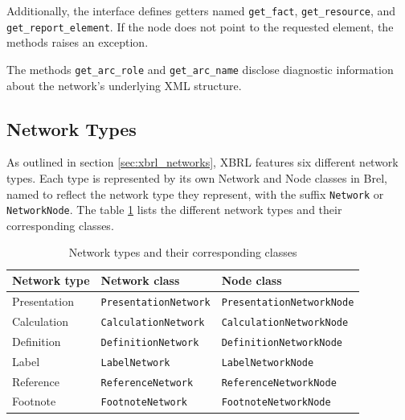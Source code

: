 Additionally, the interface defines getters named \texttt{get\_fact}, \texttt{get\_resource}, and \texttt{get\_report\_element}.
If the node does not point to the requested element, the methods raises an exception.

The methods \texttt{get\_arc\_role} and \texttt{get\_arc\_name} disclose diagnostic information about the network's underlying XML structure.

\subsection{Network Types}

As outlined in section \ref{sec:xbrl_networks}, XBRL features six different network types.
Each type is represented by its own Network and Node classes in Brel,
named to reflect the network type they represent, with the suffix \texttt{Network} or \texttt{NetworkNode}.
The table \ref{tab:network_types} lists the different network types and their corresponding classes.

\begin{table}[H]
    \centering
    \caption{Network types and their corresponding classes}
    \begin{tabular}{|l|l|l|}
        \hline
        \textbf{Network type} & \textbf{Network class} & \textbf{Node class} \\ \hline
        Presentation          & \texttt{PresentationNetwork}          & \texttt{PresentationNetworkNode}          \\ \hline
        Calculation           & \texttt{CalculationNetwork}           & \texttt{CalculationNetworkNode}           \\ \hline
        Definition            & \texttt{DefinitionNetwork}            & \texttt{DefinitionNetworkNode}            \\ \hline
        Label                 & \texttt{LabelNetwork}                 & \texttt{LabelNetworkNode}                 \\ \hline
        Reference             & \texttt{ReferenceNetwork}             & \texttt{ReferenceNetworkNode}             \\ \hline
        Footnote              & \texttt{FootnoteNetwork}              & \texttt{FootnoteNetworkNode}              \\ \hline
    \end{tabular}
    \label{tab:network_types}
\end{table}

